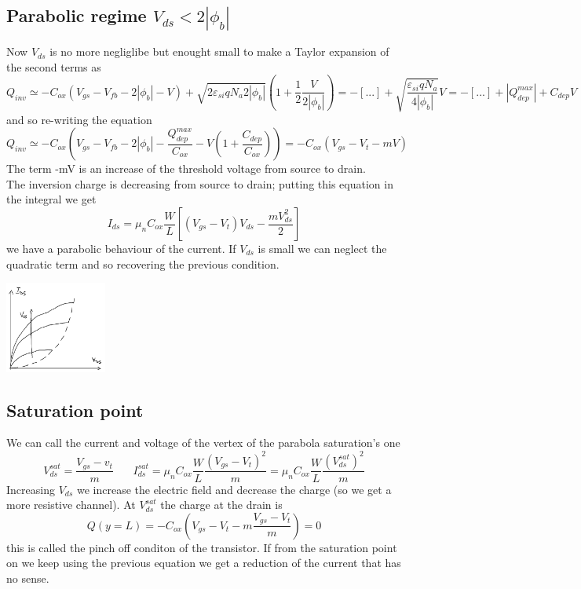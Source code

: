 \subsection{Parabolic regime $V_{ds}<2|\phi_b|$}
Now $V_{ds}$ is no more negliglibe but enought small to make a Taylor expansion of the second terms as
\begin{equation}
Q_{inv}\simeq -C_{ox}(V_{gs}-V_{fb}-2|\phi_b|-V)+\sqrt{2\varepsilon_{si}qN_a2|\phi_b|}(1+\frac{1}{2}\frac{V}{2|\phi_b|})=-[...]+\sqrt{\frac{\varepsilon_{si}qN_a}{4|\phi_b|}}V=-[...]+|Q_{dep}^{max}|+C_{dep}V
\end{equation}
and so re-writing the equation
\begin{equation}
Q_{inv}\simeq-C_{ox}(V_{gs}-V_{fb}-2|\phi_b|-\frac{Q_{dep}^{max}}{C_{ox}}-V(1+\frac{C_{dep}}{C_{ox}}))=-C_{ox}(V_{gs}-V_t-mV)
\end{equation}
The term -mV is an increase of the threshold voltage from source to drain.\\
The inversion charge is decreasing from source to drain; putting this equation in the integral we get 
\begin{equation}
I_{ds}=\mu_nC_{ox}\frac{W}{L}[(V_{gs}-V_t)V_{ds}-\frac{mV_{ds}^2}{2}]
\end{equation}
we have a parabolic behaviour of the current. If $V_{ds}$ is small we can neglect the quadratic term and so recovering the previous condition.


\centering
\includegraphics[width=0.25\textwidth]{parabreg.png}\\
\raggedright



\subsection{Saturation point}
We can call the current and voltage of the vertex of the parabola saturation's one 
\begin{equation}
V_{ds}^{sat}=\frac{V_{gs}-v_t}{m}\ \ \ \ \ \ \ \ I_{ds}^{sat}=\mu_nC_{ox}\frac{W}{L}\frac{(V_{gs}-V_t)^2}{m}=\mu_nC_{ox}\frac{W}{L}\frac{(V_{ds}^{sat})^2}{m}
\end{equation}
Increasing $V_{ds}$ we increase the electric field and decrease the charge (so we get a more resistive channel). At $V_{ds}^{sat}$ the charge at the drain is 
\begin{equation}
Q(y=L)=-C_{ox}(V_{gs}-V_t-m \frac{V_{gs}-V_t}{m})=0
\end{equation}
this is called the pinch off conditon of the transistor. If from the saturation point on we keep using the previous equation we get a reduction of the current that has no sense.\\

